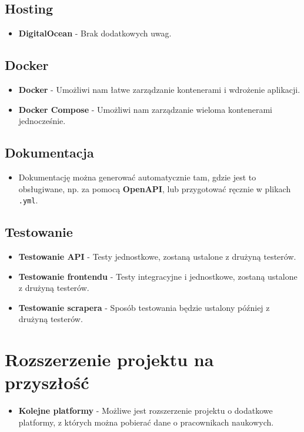 \documentclass{article}
\begin{document}
\subsection{Hosting}
\begin{itemize}
  \item \textbf{DigitalOcean} - Brak dodatkowych uwag.
\end{itemize}

\subsection{Docker}
\begin{itemize}
  \item \textbf{Docker} - Umożliwi nam łatwe zarządzanie kontenerami i wdrożenie aplikacji.
  \item \textbf{Docker Compose} - Umożliwi nam zarządzanie wieloma kontenerami jednocześnie.
\end{itemize}

\subsection{Dokumentacja}
\begin{itemize}
  \item Dokumentację można generować automatycznie tam, gdzie jest to obsługiwane, np. za pomocą \textbf{OpenAPI}, lub przygotować ręcznie w plikach \texttt{.yml}.
\end{itemize}

\subsection{Testowanie}
\begin{itemize}
  \item \textbf{Testowanie API} - Testy jednostkowe, zostaną ustalone z drużyną testerów.
  \item \textbf{Testowanie frontendu} - Testy integracyjne i jednostkowe, zostaną ustalone z drużyną testerów.
  \item \textbf{Testowanie scrapera} - Sposób testowania będzie ustalony później z drużyną testerów.
\end{itemize}
\newpage
\section{Rozszerzenie projektu na przyszłość}
\begin{itemize}
  \item \textbf{Kolejne platformy} - Możliwe jest rozszerzenie projektu o dodatkowe platformy, z których można pobierać dane o pracownikach naukowych.
\end{itemize}
\end{document}

